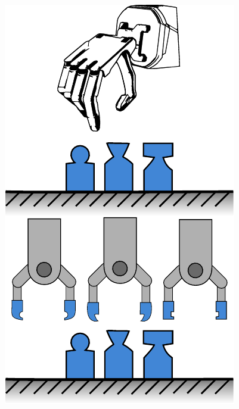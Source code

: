 \begin{figure}[h]
	\begin{center}
		\renewcommand{\arraystretch}{1.2}
		\begin{minipage}{.24\linewidth}
			\vspace{0pt}
			\centering
			\includegraphics[width=.95\textwidth]{chapters/introduction/fig/pipeline-1.pdf}
		\end{minipage}%
		\hfill%
		\begin{minipage}{.24\linewidth}
			\vspace{0pt}
			\centering

\end{minipage}
\end{center}
\end{figure}
